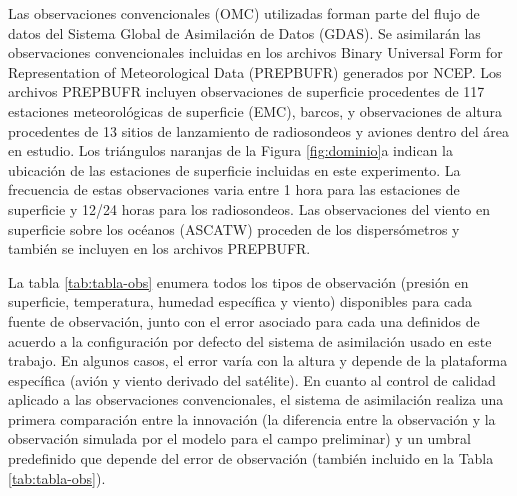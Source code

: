 \documentclass[12pt,oneside,a4paper]{reedthesis}
\begin{document}
Las observaciones convencionales (OMC) utilizadas forman parte del flujo de datos del Sistema Global de Asimilación de Datos (GDAS). Se asimilarán las observaciones convencionales incluidas en los archivos Binary Universal Form for Representation of Meteorological Data (PREPBUFR) generados por NCEP. Los archivos PREPBUFR incluyen observaciones de superficie procedentes de 117 estaciones meteorológicas de superficie (EMC), barcos, y observaciones de altura procedentes de 13 sitios de lanzamiento de radiosondeos y aviones dentro del área en estudio. Los triángulos naranjas de la Figura \ref{fig:dominio}a indican la ubicación de las estaciones de superficie incluidas en este experimento. La frecuencia de estas observaciones varia entre 1 hora para las estaciones de superficie y 12/24 horas para los radiosondeos. Las observaciones del viento en superficie sobre los océanos (ASCATW) proceden de los dispersómetros y también se incluyen en los archivos PREPBUFR.

La tabla \ref{tab:tabla-obs} enumera todos los tipos de observación (presión en superficie, temperatura, humedad específica y viento) disponibles para cada fuente de observación, junto con el error asociado para cada una definidos de acuerdo a la configuración por defecto del sistema de asimilación usado en este trabajo. En algunos casos, el error varía con la altura y depende de la plataforma específica (avión y viento derivado del satélite). En cuanto al control de calidad aplicado a las observaciones convencionales, el sistema de asimilación realiza una primera comparación entre la innovación (la diferencia entre la observación y la observación simulada por el modelo para el campo preliminar) y un umbral predefinido que depende del error de observación (también incluido en la Tabla \ref{tab:tabla-obs}).
\end{document}
